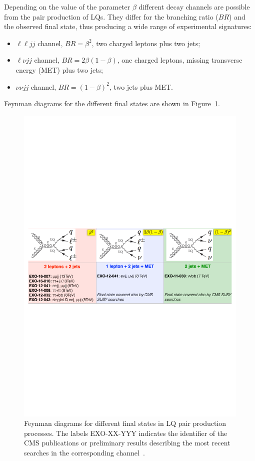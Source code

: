 \documentclass[epj]{webofc}
\begin{document}
Depending on the value of the parameter $\beta$ different decay channels
are possible from the pair production of LQs. They differ for the
branching ratio ($BR$) and the observed final state, thus producing a
wide range of experimental signatures: 
\begin{itemize}
\item $\ell\ell jj$ channel, $BR=\beta^2$, two charged leptons plus two jets;
\item $\ell\nu jj$ channel, $BR=2\beta(1-\beta)$, one charged leptons,
  missing transverse energy (MET) plus two jets;
\item $\nu\nu jj$ channel, $BR=(1-\beta)^2$, two jets plus MET.
\end{itemize}
Feynman diagrams for the different final states are shown in Figure~\ref{LQdiagram}.
%
\begin{figure}[h]
\centering
\includegraphics[width=13cm,clip]{LQdiagram.pdf}
\caption{Feynman diagrams for different final states in LQ pair
 production processes. The labels {\sc EXO-XX-YYY} indicates the identifier
of the CMS publications or preliminary results describing the most recent 
searches in the corresponding channel~\cite{EXOpages}.}
\label{LQdiagram}       %
\end{figure}
%
\end{document}

